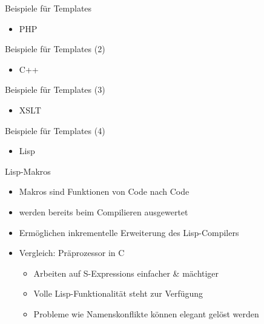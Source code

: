 \documentclass{beamer}
\newcommand{\pfeil}{\item[$\Rightarrow$]}
\begin{document}
\begin{frame}{Beispiele für Templates}
  \begin{itemize}
  \item PHP
  \end{itemize}
\end{frame}

\begin{frame}{Beispiele für Templates (2)}
  \begin{itemize}
  \item C++
  \end{itemize}
\end{frame}

\begin{frame}{Beispiele für Templates (3)}
  \begin{itemize}
  \item XSLT
  \end{itemize}
\end{frame}

\begin{frame}{Beispiele für Templates (4)}
  \begin{itemize}
  \item Lisp
  \end{itemize}
\end{frame}

\begin{frame}{Lisp-Makros}
  \begin{itemize}
  \item Makros sind Funktionen von Code nach Code
  \item werden bereits beim Compilieren ausgewertet
  \item Ermöglichen inkrementelle Erweiterung des Lisp-Compilers
  \item Vergleich: Präprozessor in C
    \begin{itemize}
    \item Arbeiten auf S-Expressions einfacher \& mächtiger
    \item Volle Lisp-Funktionalität steht zur Verfügung
    \pfeil Probleme wie Namenskonflikte können elegant gelöst werden
    \end{itemize}
  \end{itemize}
\end{frame}
\end{document}
